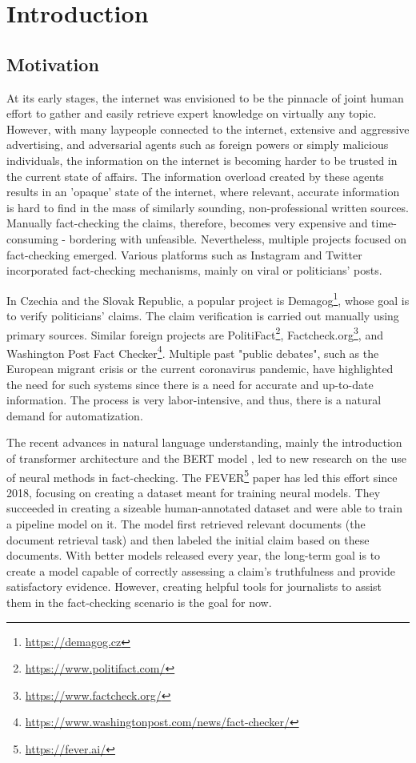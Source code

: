 \chapter*{Introduction}
\section*{Motivation}
At its early stages, the internet was envisioned to be the pinnacle of joint human effort to gather and easily retrieve expert knowledge on virtually any topic.
However, with many laypeople connected to the internet, extensive and aggressive advertising, and adversarial agents such as foreign powers or simply malicious individuals, the information on the internet is becoming harder to be trusted in the current state of affairs.
The information overload created by these agents results in an 'opaque' state of the internet, where relevant, accurate information is hard to find in the mass of similarly sounding, non-professional written sources.
Manually fact-checking the claims, therefore, becomes very expensive and time-consuming - bordering with unfeasible.
Nevertheless, multiple projects focused on fact-checking emerged. 
Various platforms such as Instagram and Twitter incorporated fact-checking mechanisms, mainly on viral or politicians' posts. 

In Czechia and the Slovak Republic, a popular project is Demagog\footnote{\url{https://demagog.cz}}, whose goal is to verify politicians' claims.
The claim verification is carried out manually using primary sources. 
Similar foreign projects are PolitiFact\footnote{\url{https://www.politifact.com/}}, Factcheck.org\footnote{\url{https://www.factcheck.org/}}, and Washington Post Fact Checker\footnote{\url{https://www.washingtonpost.com/news/fact-checker/}}.
Multiple past "public debates", such as the European migrant crisis or the current coronavirus pandemic, have highlighted the need for such systems since there is a need for accurate and up-to-date information.
The process is very labor-intensive, and thus, there is a natural demand for automatization.

The recent advances in natural language understanding, mainly the introduction of transformer architecture \citep{transformers-vaswani} and the BERT model \citep{bert}, led to new research on the use of neural methods in fact-checking.
The FEVER\footnote{\url{https://fever.ai/}} paper \citep{fever} has led this effort since 2018, focusing on creating a dataset meant for training neural models.
They succeeded in creating a sizeable human-annotated dataset and were able to train a pipeline model on it.
The model first retrieved relevant documents (the document retrieval task) and then labeled the initial claim based on these documents. 
With better models released every year, the long-term goal is to create a model capable of correctly assessing a claim's truthfulness and provide satisfactory evidence. However, creating helpful tools for journalists to assist them in the fact-checking scenario is the goal for now.

